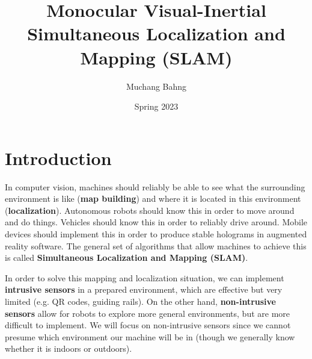 \documentclass{article}
\theoremstyle{definition}
\theoremstyle{remark}
\theoremstyle{definition}
\begin{document}
\pagestyle{fancy}

\cfoot{\thepage / \pageref{LastPage}}

\title{Monocular Visual-Inertial Simultaneous Localization and Mapping (SLAM)}
\author{Muchang Bahng}
\date{Spring 2023}

\maketitle
\section{Introduction}

In computer vision, machines should reliably be able to see what the surrounding environment is like (\textbf{map building}) and where it is located in this environment (\textbf{localization}). Autonomous robots should know this in order to move around and do things. Vehicles should know this in order to reliably drive around. Mobile devices should implement this in order to produce stable holograms in augmented reality software. The general set of algorithms that allow machines to achieve this is called \textbf{Simultaneous Localization and Mapping (SLAM)}. 

In order to solve this mapping and localization situation, we can implement \textbf{intrusive sensors} in a prepared environment, which are effective but very limited (e.g. QR codes, guiding rails). On the other hand, \textbf{non-intrusive sensors} allow for robots to explore more general environments, but are more difficult to implement. We will focus on non-intrusive sensors since we cannot presume which environment our machine will be in (though we generally know whether it is indoors or outdoors). 
\end{document}

